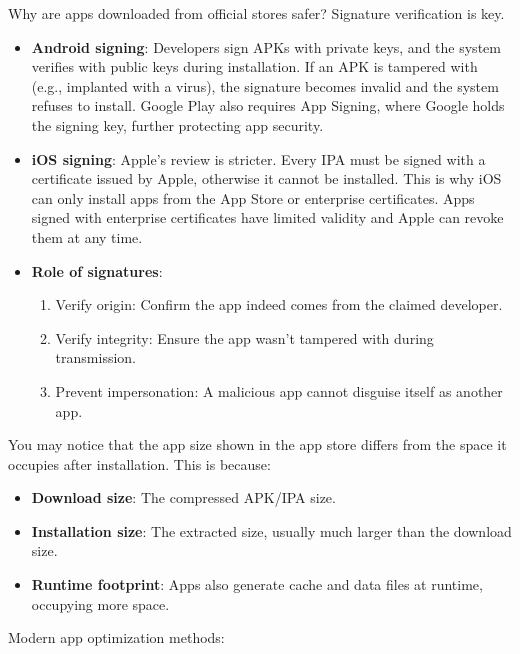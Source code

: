 
Why are apps downloaded from official stores safer? Signature verification is key.

\begin{itemize}
  \item \textbf{Android signing}: Developers sign APKs with private keys, and the system verifies with public keys during installation. If an APK is tampered with (e.g., implanted with a virus), the signature becomes invalid and the system refuses to install. Google Play also requires App Signing, where Google holds the signing key, further protecting app security.
  \item \textbf{iOS signing}: Apple's review is stricter. Every IPA must be signed with a certificate issued by Apple, otherwise it cannot be installed. This is why iOS can only install apps from the App Store or enterprise certificates. Apps signed with enterprise certificates have limited validity and Apple can revoke them at any time.
  \item \textbf{Role of signatures}:
  \begin{enumerate}
    \item Verify origin: Confirm the app indeed comes from the claimed developer.
    \item Verify integrity: Ensure the app wasn't tampered with during transmission.
    \item Prevent impersonation: A malicious app cannot disguise itself as another app.
  \end{enumerate}
\end{itemize}


You may notice that the app size shown in the app store differs from the space it occupies after installation. This is because:

\begin{itemize}
  \item \textbf{Download size}: The compressed APK/IPA size.
  \item \textbf{Installation size}: The extracted size, usually much larger than the download size.
  \item \textbf{Runtime footprint}: Apps also generate cache and data files at runtime, occupying more space.
\end{itemize}

Modern app optimization methods:

